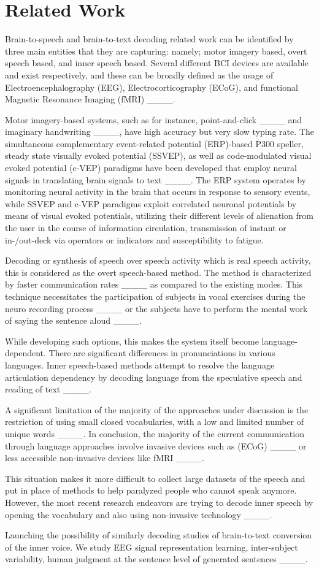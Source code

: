 \section{Related Work}
Brain-to-speech and brain-to-text decoding related work can be identified by three main entities that they are capturing: namely; motor imagery based, overt speech based, and inner speech based. Several different BCI devices are available and exist respectively, and these can be broadly defined as the usage of Electroencephalography (EEG), Electrocorticography (ECoG), and functional Magnetic Resonance Imaging (fMRI) ____.

Motor imagery-based systems, such as for instance, point-and-click ____ and imaginary handwriting ____, have high accuracy but very slow typing rate. The simultaneous complementary event-related potential (ERP)-based P300 speller, steady state visually evoked potential (SSVEP), as well as code-modulated visual evoked potential (c-VEP) paradigms have been developed that employ neural signals in translating brain signals to text ____. The ERP system operates by monitoring neural activity in the brain that occurs in response to sensory events, while SSVEP and c-VEP paradigms exploit correlated neuronal potentials by means of visual evoked potentials, utilizing their different levels of alienation from the user in the course of information circulation, transmission of instant or in-/out-deck via operators or indicators and susceptibility to fatigue.

Decoding or synthesis of speech over speech activity which is real speech activity, this is considered as the overt speech-based method. The method is characterized by faster communication rates ____ as compared to the existing modes. This technique necessitates the participation of subjects in vocal exercises during the neuro recording process ____ or the subjects have to perform the mental work of saying the sentence aloud ____.

While developing such options, this makes the system itself become language-dependent. There are significant differences in pronunciations in various languages. Inner speech-based methods attempt to resolve the language articulation dependency by decoding language from the speculative speech and reading of text ____.

A significant limitation of the majority of the approaches under discussion is the restriction of using small closed vocabularies, with a low and limited number of unique words ____. In conclusion, the majority of the current communication through language approaches involve invasive devices such as (ECoG) ____ or less accessible non-invasive devices like fMRI ____.

This situation makes it more difficult to collect large datasets of the speech and put in place of methods to help paralyzed people who cannot speak anymore. However, the most recent research endeavors are trying to decode inner speech by opening the vocabulary and also using non-invasive technology ____.

Launching the possibility of similarly decoding studies of brain-to-text conversion of the inner voice. We study EEG signal representation learning, inter-subject variability, human judgment at the sentence level of generated sentences ____.